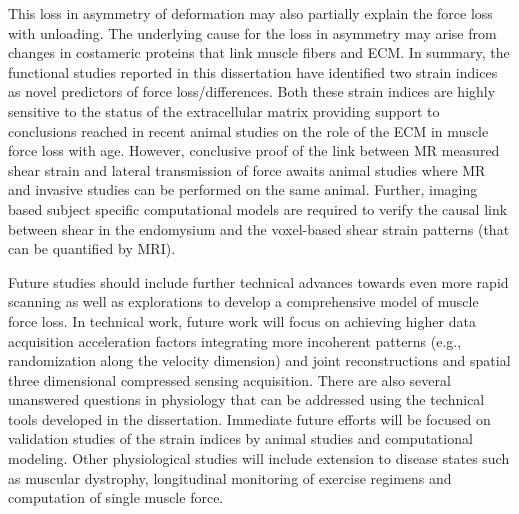 This loss in asymmetry of deformation may also partially explain the force loss with unloading. 
The underlying cause for the loss in asymmetry may arise from changes in costameric proteins that link muscle fibers and ECM. 
In summary, the functional studies reported in this dissertation have identified two strain indices as novel predictors of force loss/differences. 
Both these strain indices are highly sensitive to the status of the extracellular matrix providing support to conclusions reached in recent animal studies on the role of the ECM in muscle force loss with age. 
However, conclusive proof of the link between MR measured shear strain and lateral transmission of force awaits animal studies where MR and invasive studies can be performed on the same animal. 
Further, imaging based subject specific computational models are required to verify the causal link between shear in the endomysium and the voxel-based shear strain patterns (that can be quantified by MRI).

Future studies should include further technical advances towards even more rapid scanning as well as explorations to develop a comprehensive model of muscle force loss. 
In technical work, future work will focus on achieving higher data acquisition acceleration factors integrating more incoherent patterns (e.g., randomization along the velocity dimension) and joint reconstructions and spatial three dimensional compressed sensing acquisition. 
There are also several unanswered questions in physiology that can be addressed using the technical tools developed in the dissertation. 
Immediate future efforts will be focused on validation studies of the strain indices by animal studies and computational modeling. 
Other physiological studies will include extension to disease states such as muscular dystrophy, longitudinal monitoring of exercise regimens and computation of single muscle force.

